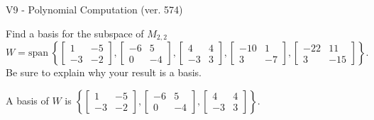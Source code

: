 \begin{exercise}
  \begin{exerciseTitle}V9 - Polynomial Computation (ver. 574)\end{exerciseTitle}
  \begin{exerciseStatement}
    Find a basis for the subspace of \(M_{2,2}\) 
\[W=\mathrm{span}\ \left\{\left[\begin{array}{cc}
1 & -5 \\
-3 & -2
\end{array}\right] , \left[\begin{array}{cc}
-6 & 5 \\
0 & -4
\end{array}\right] , \left[\begin{array}{cc}
4 & 4 \\
-3 & 3
\end{array}\right] , \left[\begin{array}{cc}
-10 & 1 \\
3 & -7
\end{array}\right] , \left[\begin{array}{cc}
-22 & 11 \\
3 & -15
\end{array}\right]\right\}.\]
 Be sure to explain why your result is a basis.


  \end{exerciseStatement}
  \begin{exerciseAnswer}
   A basis of \(W\) is  \(\left\{\left[\begin{array}{cc}
1 & -5 \\
-3 & -2
\end{array}\right] , \left[\begin{array}{cc}
-6 & 5 \\
0 & -4
\end{array}\right] , \left[\begin{array}{cc}
4 & 4 \\
-3 & 3
\end{array}\right]\right\}\).
  


  \end{exerciseAnswer}
\end{exercise}
